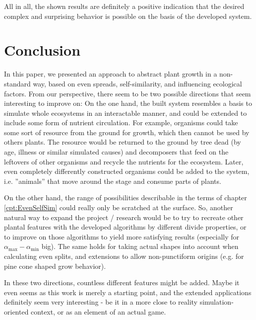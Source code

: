 \documentclass[11pt]{scrartcl}
\begin{document}
All in all, the shown results are definitely a positive indication that the desired complex and surprising behavior is possible on the basis of the developed system.

\section{Conclusion}
In this paper, we presented an approach to abstract plant growth in a non-standard way, based on even spreads, self-similarity, and influencing ecological factors. From our perspective, there seem to be two possible directions that seem interesting to improve on: On the one hand, the built system resembles a basis to simulate whole ecosystems in an interactable manner, and could be extended to include some form of nutrient circulation. For example, organisms could take some sort of resource from the ground for growth, which then cannot be used by others plants. The resource would be returned to the ground by tree dead (by age, illness or similar simulated causes) and decomposers that feed on the leftovers of other organisms and recycle the nutrients for the ecosystem. Later, even completely differently constructed organisms could be added to the system, i.e. ''animals'' that move around the stage and consume parts of plants.

On the other hand, the range of possibilities describable in the terms of chapter \ref{cpt:EvenSelfSim} could really only be scratched at the surface. So, another natural way to expand the project / research would be to try to recreate other plantal features with the developed algorithms by different divide properties, or to improve on those algorithms to yield more satisfying results (especially for $\alpha_\text{max} - \alpha_\text{min}$ big). The same holds for taking actual shapes into account when calculating even splits, and extensions to allow non-punctiform origins (e.g. for pine cone shaped grow behavior).

In these two directions, countless different features might be added. Maybe it even seems as this work is merely a starting point, and the extended applications definitely seem very interesting - be it in a more close to reality simulation-oriented context, or as an element of an actual game.
\end{document}
